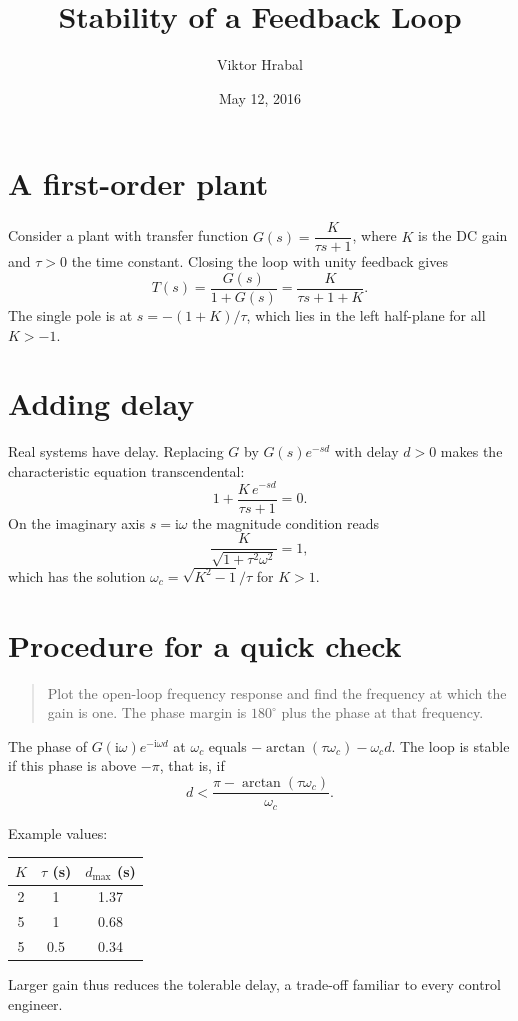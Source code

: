 \documentclass[12pt,a4paper]{article}
\title{Stability of a Feedback Loop}
\author{Viktor Hrabal}
\date{May 12, 2016}
\newcommand{\sv}{s}
\begin{document}
\maketitle

\section{A first-order plant}
Consider a plant with transfer function $G(\sv)=\dfrac{K}{\tau\sv+1}$, where $K$ is the DC gain and $\tau>0$ the time constant. Closing the loop with unity feedback gives
\begin{equation}
  T(\sv)=\frac{G(\sv)}{1+G(\sv)}=\frac{K}{\tau\sv+1+K}.
\end{equation}
The single pole is at $\sv=-(1+K)/\tau$, which lies in the left half-plane for all $K>-1$.

\section{Adding delay}
Real systems have delay. Replacing $G$ by $G(\sv)e^{-\sv d}$ with delay $d>0$ makes the characteristic equation transcendental:
\[
  1+\frac{K\,e^{-\sv d}}{\tau\sv+1}=0 .
\]
On the imaginary axis $\sv=\mathrm{i}\omega$ the magnitude condition reads
\[
  \frac{K}{\sqrt{1+\tau^2\omega^2}}=1,
\]
which has the solution $\omega_c=\sqrt{K^2-1}/\tau$ for $K>1$.

\section*{Procedure for a quick check}
\begin{quote}
Plot the open-loop frequency response and find the frequency at which the gain is one. The phase margin is $180^\circ$ plus the phase at that frequency.
\end{quote}

The phase of $G(\mathrm{i}\omega)e^{-\mathrm{i}\omega d}$ at $\omega_c$ equals $-\arctan(\tau\omega_c)-\omega_c d$. The loop is stable if this phase is above $-\pi$, that is, if
\[
  d < \frac{\pi-\arctan(\tau\omega_c)}{\omega_c}.
\]

\begin{flushleft}
Example values:
\end{flushleft}
\begin{center}
\begin{tabular}{c|c|c}
$K$ & $\tau$ (s) & $d_{\max}$ (s)\\
\hline
2 & 1 & 1.37\\
5 & 1 & 0.68\\
5 & 0.5 & 0.34\\
\end{tabular}
\end{center}

Larger gain thus reduces the tolerable delay, a trade-off familiar to every control engineer.
\end{document}
